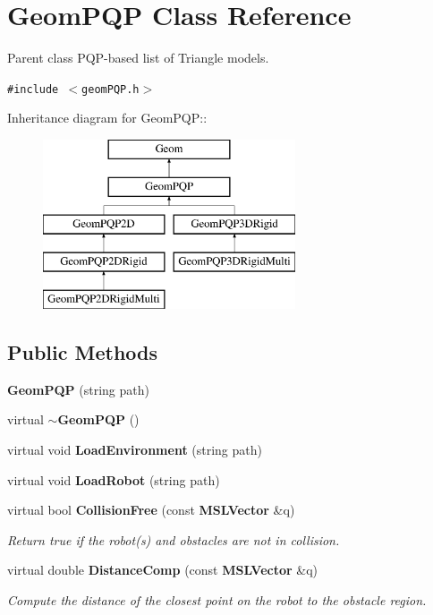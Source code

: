 \section{Geom\-PQP  Class Reference}
\label{class_GeomPQP}
Parent class PQP-based list of Triangle models. 


{\tt \#include $<$geom\-PQP.h$>$}

Inheritance diagram for Geom\-PQP::\begin{figure}[H]
\begin{center}
\leavevmode
\includegraphics[height=5cm]{class_GeomPQP}
\end{center}
\end{figure}
\subsection*{Public Methods}
\begin{CompactItemize}
\item 
{\bf Geom\-PQP} (string path)
\item 
virtual {\bf $\sim$Geom\-PQP} ()
\item 
virtual void {\bf Load\-Environment} (string path)
\item 
virtual void {\bf Load\-Robot} (string path)
\item 
virtual bool {\bf Collision\-Free} (const {\bf MSLVector} \&q)
\begin{CompactList}\small\item\em Return true if the robot(s) and obstacles are not in collision.\item\end{CompactList}\item 
virtual double {\bf Distance\-Comp} (const {\bf MSLVector} \&q)
\begin{CompactList}\small\item\em Compute the distance of the closest point on the robot to the obstacle region.\item\end{CompactList}\end{CompactItemize}
